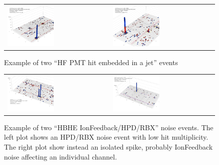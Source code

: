 %
\begin{figure}[h]
 \centering
 \begin{tabular}{ll}
   \includegraphics[width=0.47\textwidth]{fig//HFhitInJet.png} & 
   \includegraphics[width=0.47\textwidth]{fig//HFhitInJet_1.png} \\
 \end{tabular}
\caption{Example of two ``HF PMT hit embedded in a jet'' events}
\label{fig:HFhitEmbeddedInJet}
\end{figure}

%
\begin{figure}[h]
 \centering
 \begin{tabular}{ll}
   \includegraphics[width=0.47\textwidth]{fig/HBHEnoise_lowMult.png} &
   \includegraphics[width=0.47\textwidth]{fig/HBHEnoise_spike.png} \\
 \end{tabular}
\caption{Example of two ``HBHE IonFeedback/HPD/RBX'' noise events. 
The left plot shows an HPD/RBX noise event with low hit multiplicity. 
The right plot show instead an isolated spike, 
probably IonFeedback noise affecting an individual channel.}
\label{fig:HBHEnoise}
\end{figure}

